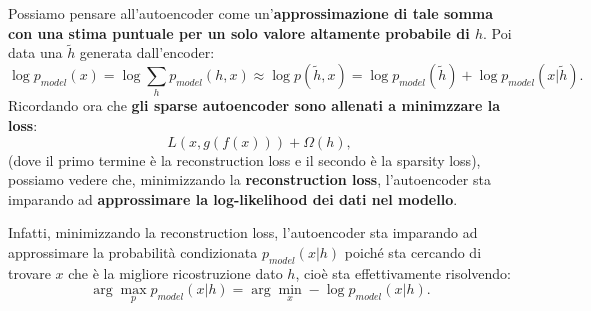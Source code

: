 \newline
Possiamo pensare all'autoencoder come un'\textbf{approssimazione di tale somma con una stima puntuale per 
un solo valore altamente probabile di $h$}.
\newline
\newline
Poi data una $\tilde{h}$ generata dall'encoder:
\begin{equation}
  \log{p_{model}(x)}=\log\sum_hp_{model}(h,x)\approx\log{p(\tilde{h},x)}=\log{p_{model}(\tilde{h})}+\log{p_{model
  }(x|\tilde{h})}.
\end{equation}
\newline
\newline
Ricordando ora che \textbf{gli sparse autoencoder sono allenati a minimzzare la loss}:
\begin{equation}
  L(x,g(f(x)))+\Omega(h),
\end{equation}
(dove il primo termine è la reconstruction loss e il secondo è la sparsity loss), possiamo vedere che, 
minimizzando la \textbf{reconstruction loss}, l'autoencoder sta imparando ad \textbf{approssimare la 
log-likelihood dei dati nel modello}.



Infatti, minimizzando la reconstruction loss, l'autoencoder sta imparando ad approssimare la probabilità
condizionata $p_{model}(x|h)$ poiché sta cercando di trovare $x$ che è la migliore ricostruzione dato $h$, 
cioè sta effettivamente risolvendo:
\begin{equation}
  \arg \max_p p_{model}(x|h)=\arg \min_x-\log p_{model}(x|h).
\end{equation}
\newpage

